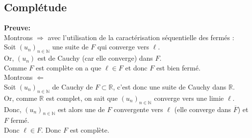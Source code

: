\documentclass{article}
\begin{document}
\subsection{Complétude}



\noindent\textbf{Preuve:}\\
Montrons $\Rightarrow$ avec l'utilisation de la caractérisation séquentielle des fermés :\\
\indent Soit $(u_n)_{n\in \mathbb{N}}$ une suite de $F$ qui converge vers $\ell$.\\
\indent Or, $(u_n)$ est de Cauchy (car elle converge) dans $F$.\\
\indent Comme $F$ est complète on a que $\ell \in F$ et donc $F$ est bien fermé.\\
Montrons $\Leftarrow$\\
\indent Soit $(u_n)_{n\in \mathbb{N}}$ de Cauchy de $F\subset \mathbb{R}$, c'est donc une suite de Cauchy dans $\mathbb{R}$.\\
\indent Or, comme $\mathbb{R}$ est complet, on sait que $(u_n)_{n\in \mathbb{N}}$ converge vers une limie $\ell$.\\
\indent Donc, $(u_n)_{n\in \mathbb{N}}$ est alors une de $F$ convergente vers $\ell$ (elle converge dans $\overline{F}$) et $F$ fermé.\\
\indent Donc $\ell \in F$. \indent Donc $F$ est complète.
\end{document}
